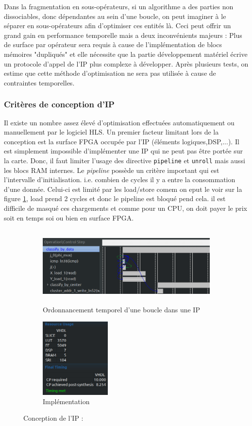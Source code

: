 \documentclass[12pt,a4paper]{article}
\begin{document}
Dans la fragmentation en sous-opérateurs, si un algorithme a des parties non dissociables, donc dépendantes au sein d'une boucle, on peut imaginer à le séparer en sous-opérateurs afin d'optimiser ces entités là. Ceci peut offrir un grand gain en performance temporelle mais a deux inconvénients majeurs : Plus de surface par opérateur sera requis à cause de l'implémentation de blocs mémoires "dupliqués" et elle nécessite que la partie développement matériel écrive un protocole d'appel de l'IP plus complexe à développer. Après plusieurs tests, on estime que cette méthode d'optimisation ne sera pas utilisée à cause de contraintes temporelles.

\subsubsection{Critères de conception d'IP}
Il existe un nombre assez élevé d'optimisation effectuées automatiquement ou manuellement par le logiciel HLS. Un premier facteur limitant lors de la conception est la surface FPGA occupée par l'IP (éléments logiques,DSP,...). Il est simplement impossible d'implémenter une IP qui ne peut pas être portée sur la carte. Donc, il faut limiter l'usage des directive \texttt{pipeline} et \texttt{unroll} mais aussi les blocs RAM internes. Le \textit{pipeline} possède un critère important qui est l'intervalle d'initialisation. i.e. combien de cycles il y a entre la consommation d'une donnée. Celui-ci est limité par les load/store comem on eput le voir sur la figure \ref{fig:scheduler}, load prend 2 cycles et donc le pipeline est bloqué pend cela. il est difficile de masqué ces chargements et comme pour un CPU, on doit payer le prix soit en temps soi ou bien  en surface FPGA.

\begin{figure}[H]
	\centering
\begin{subfigure}{.75\textwidth}
	\centering
	\includegraphics[height=4cm]{hls_fig/screenshot005}
	\caption{Ordonnancement temporel d'une boucle dans une IP}
	\label{fig:scheduler}
\end{subfigure}
\begin{subfigure}{.20\textwidth}
	\centering
	\includegraphics[height=4cm]{hls_fig/screenshot004}
	\caption{Implémentation}
	\label{fig:timing_met}
\end{subfigure}
\caption{Conception de l'IP :}
\end{figure}
\end{document}

